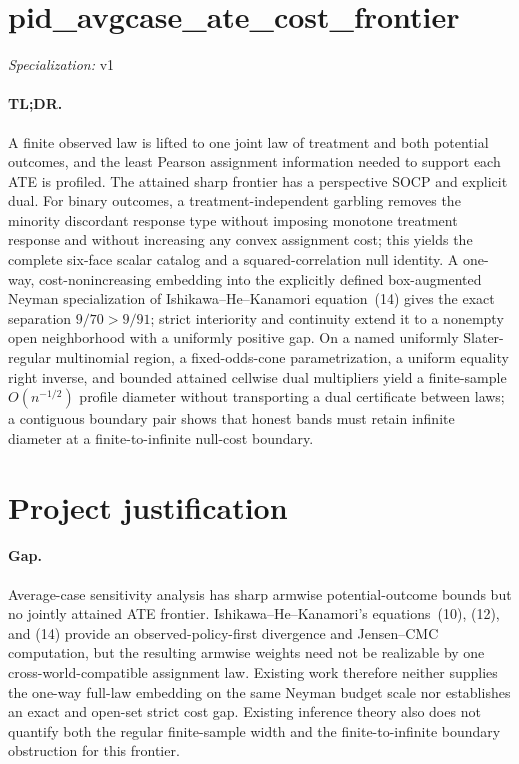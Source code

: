 \documentclass{article}
\begin{document}
\sloppy

\section*{pid\_\allowbreak{}avgcase\_\allowbreak{}ate\_\allowbreak{}cost\_\allowbreak{}frontier}

\noindent\textit{Specialization:} v1\par

\paragraph{TL;DR.} A finite observed law is lifted to one joint law of treatment and both potential outcomes, and the least Pearson assignment information needed to support each ATE is profiled. The attained sharp frontier has a perspective SOCP and explicit dual. For binary outcomes, a treatment-independent garbling removes the minority discordant response type without imposing monotone treatment response and without increasing any convex assignment cost; this yields the complete six-face scalar catalog and a squared-correlation null identity. A one-way, cost-nonincreasing embedding into the explicitly defined box-augmented Neyman specialization of Ishikawa--He--Kanamori equation~(14) gives the exact separation \(9/70>9/91\); strict interiority and continuity extend it to a nonempty open neighborhood with a uniformly positive gap. On a named uniformly Slater-regular multinomial region, a fixed-odds-cone parametrization, a uniform equality right inverse, and bounded attained cellwise dual multipliers yield a finite-sample \(O(n^{-1/2})\) profile diameter without transporting a dual certificate between laws; a contiguous boundary pair shows that honest bands must retain infinite diameter at a finite-to-infinite null-cost boundary.

\section{Project justification}

\paragraph{Gap.} Average-case sensitivity analysis has sharp armwise potential-outcome bounds but no jointly attained ATE frontier. Ishikawa--He--Kanamori's equations~(10), (12), and (14) provide an observed-policy-first divergence and Jensen--CMC computation, but the resulting armwise weights need not be realizable by one cross-world-compatible assignment law. Existing work therefore neither supplies the one-way full-law embedding on the same Neyman budget scale nor establishes an exact and open-set strict cost gap. Existing inference theory also does not quantify both the regular finite-sample width and the finite-to-infinite boundary obstruction for this frontier.
\end{document}
